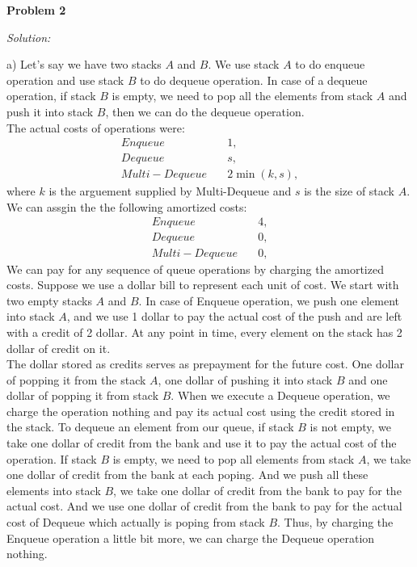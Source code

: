 \documentclass[12pt,letterpaper]{article}
\def\pp{\par\noindent}
\newcommand{\problem}[1]{ \bigskip \pp \textbf{Problem #1}\par}
\newcommand{\solution}{\textit{Solution:}\par}
\begin{document}
\problem{2}
\solution
a) Let's say we have two stacks $A$ and $B$. We use stack $A$ to do enqueue operation and use stack $B$ to do dequeue operation. In case of a dequeue operation, if stack $B$ is empty, we need to pop all the elements from stack $A$ and push it into stack $B$, then we can do the dequeue operation. \\
The actual costs of operations were:
\begin{align*}
Enqueue \quad & 1, \\
Dequeue \quad & s, \\
Multi-Dequeue \quad & 2 \min(k,s),
\end{align*}
where $k$ is the arguement supplied by Multi-Dequeue and $s$ is the size of stack $A$. We can assgin the the following amortized costs: 
\begin{align*}
Enqueue \quad & 4, \\
Dequeue \quad & 0, \\
Multi-Dequeue \quad & 0,
\end{align*}
We can pay for any sequence of queue operations by charging the amortized costs. Suppose we use a dollar bill to represent each unit of cost. We start with two empty stacks $A$ and $B$. In case of Enqueue operation, we push one element into stack $A$, and we use 1 dollar to pay the actual cost of the push and are left with a credit of 2 dollar. At any point in time, every element on the stack has 2 dollar of credit on it. \\
The dollar stored as credits serves as prepayment for the future cost. One dollar of popping it from the stack $A$, one dollar of pushing it into stack $B$ and one dollar of popping it from stack $B$. When we execute a Dequeue operation, we charge the operation nothing and pay its actual cost using the credit stored in the stack. To dequeue an element from our queue, if stack $B$ is not empty, we take one dollar of credit from the bank and use it to pay the actual cost of the operation. If stack $B$ is empty, we need to pop all elements from stack $A$, we take one dollar of credit from the bank at each poping. And we push all these elements into stack $B$, we take one dollar of credit from the bank to pay for the actual cost. And we use one dollar of credit from the bank to pay for the actual cost of Dequeue which actually is poping from stack $B$. Thus, by charging the Enqueue operation a little bit more, we can charge the Dequeue operation nothing. \\
\end{document}

